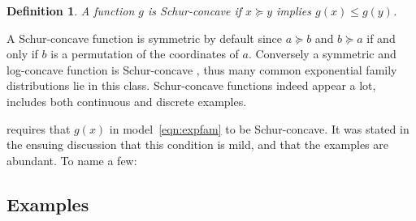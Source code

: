 \documentclass[11pt]{article}
\newtheorem{definition}{Definition}
\begin{document}
\begin{definition}
A function $g$ is Schur-concave if $x \succeq y$ implies $g\left(x\right) \le g\left(y\right)$.
\end{definition}

A Schur-concave function is symmetric by default since $a \succeq b$ and $b \succeq a$ if and only if $b$ is a permutation of the coordinates of $a$. Conversely a symmetric and log-concave function is Schur-concave \citep{Marshall:2010hb}, thus many common exponential family distributions lie in this class. Schur-concave functions indeed appear a lot,  includes both continuous and discrete examples.

 requires that $g\left(x\right)$ in model~\eqref{eqn:expfam} to be Schur-concave. It was stated in the ensuing discussion that this condition is mild, and that the examples are abundant. To name a few:

\subsection{Examples}
\label{sec:examples}
\end{document}

